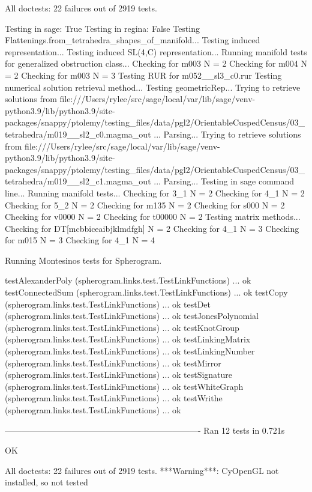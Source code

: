 All doctests:
   22 failures out of 2919 tests.

Testing in sage: True
Testing in regina: False
Testing Flattenings.from_tetrahedra_shapes_of_manifold...
Testing induced representation...
Testing induced SL(4,C) representation...
Running manifold tests for generalized obstruction class...
Checking for m003 N = 2
Checking for m004 N = 2
Checking for m003 N = 3
Testing RUR for m052__sl3_c0.rur
Testing numerical solution retrieval method...
Testing geometricRep...
Trying to retrieve solutions from file:///Users/rylee/src/sage/local/var/lib/sage/venv-python3.9/lib/python3.9/site-packages/snappy/ptolemy/testing_files/data/pgl2/OrientableCuspedCensus/03_tetrahedra/m019__sl2_c0.magma_out ...
Parsing...
Trying to retrieve solutions from file:///Users/rylee/src/sage/local/var/lib/sage/venv-python3.9/lib/python3.9/site-packages/snappy/ptolemy/testing_files/data/pgl2/OrientableCuspedCensus/03_tetrahedra/m019__sl2_c1.magma_out ...
Parsing...
Testing in sage command line...
Running manifold tests...
Checking for 3_1 N = 2
Checking for 4_1 N = 2
Checking for 5_2 N = 2
Checking for m135 N = 2
Checking for s000 N = 2
Checking for v0000 N = 2
Checking for t00000 N = 2
Testing matrix methods...
Checking for DT[mcbbiceaibjklmdfgh] N = 2
Checking for 4_1 N = 3
Checking for m015 N = 3
Checking for 4_1 N = 4

Running Montesinos tests for Spherogram.

testAlexanderPoly (spherogram.links.test.TestLinkFunctions) ... ok
testConnectedSum (spherogram.links.test.TestLinkFunctions) ... ok
testCopy (spherogram.links.test.TestLinkFunctions) ... ok
testDet (spherogram.links.test.TestLinkFunctions) ... ok
testJonesPolynomial (spherogram.links.test.TestLinkFunctions) ... ok
testKnotGroup (spherogram.links.test.TestLinkFunctions) ... ok
testLinkingMatrix (spherogram.links.test.TestLinkFunctions) ... ok
testLinkingNumber (spherogram.links.test.TestLinkFunctions) ... ok
testMirror (spherogram.links.test.TestLinkFunctions) ... ok
testSignature (spherogram.links.test.TestLinkFunctions) ... ok
testWhiteGraph (spherogram.links.test.TestLinkFunctions) ... ok
testWrithe (spherogram.links.test.TestLinkFunctions) ... ok

----------------------------------------------------------------------
Ran 12 tests in 0.721s

OK

All doctests:
   22 failures out of 2919 tests.
***Warning***: CyOpenGL not installed, so not tested
